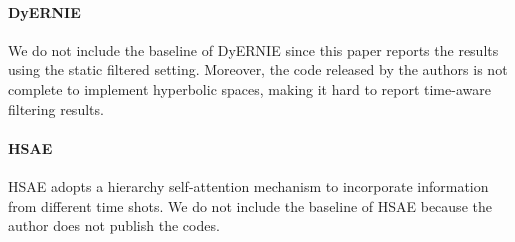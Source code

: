 \documentclass[letterpaper]{article} %
\begin{document}
\paragraph{DyERNIE} We do not include the baseline of DyERNIE\cite{han2020dyernie} since this paper reports the results using the static filtered setting. Moreover, the code released by the authors is not complete to implement hyperbolic spaces, making it hard to report time-aware filtering results.

\paragraph{HSAE} HSAE\cite{ren2023hierarchical} adopts a hierarchy self-attention mechanism to incorporate information from different time shots. We do not include the baseline of HSAE because the author does not publish the codes.

\clearpage
\end{document}
